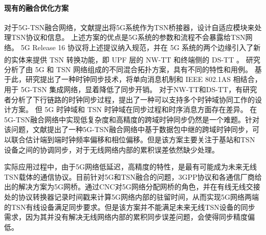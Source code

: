 \documentclass[UTF8,a4paper,12pt]{ctexart}
\numberwithin{equation}{section}
\begin{document}
	\paragraph{现有的融合优化方案}
	对于5G-TSN融合网络，文献\cite{nasrallah2018ultra}提出将5G系统作为TSN桥接器，设计自适应模块来处理TSN协议和信息。 上述方案的优点是5G系统的参数和流程不会暴露给TSN网络。 5G Release 16 协议将上述提议纳入规范，并在 5G 系统的两个边缘引入了新的实体来提供 TSN 转换功能，即 UPF 层的 NW-TT 和终端侧的 DS-TT \textsuperscript{\cite{wang2020leveraging}}。 研究\cite{neumann2018towards}分析了由 5G 和 TSN 网络组成的不同混合拓扑方案，具有不同的特性和用例。 基于此，研究\cite{chai2021cross}提出了一种时钟同步技术，将单向消息机制和 IEEE 802.1AS 相结合，用于 5G-TSN 集成网络，显着降低了同步开销。 对于NW-TT和DS-TT，有研究者\cite{lei20215g}分析了下行链路的时钟同步过程，提出了一种可以支持多个时钟域协同工作的设计方案。 但 5G 时钟域和 TSN 时钟域在同步过程和时序消息方面存在差异。 在5G-TSN融合网络中实现低复杂度和高精度的跨域时钟同步仍然是一个难题。针对该问题，文献\cite{schungel2022time}提出了一种5G-TSN融合网络中基于数据包中继的跨域时钟同步，可以联合估计端到端时钟频率偏移和相位偏移。但是该方案主要关注于基站和TSN设备之间的协调同步，对于无线网络内部的累积误差依然缺少处理。
	
	实际应用过程中，由于5G网络低延迟，高精度的特性，是最有可能成为未来无线TSN载体的通信协议。目前针对5G和TSN融合的问题，3GPP协议和各通信厂商给出的解决方案为5G网桥。通过CNC对5G网络分配网桥的角色，并在有线无线交接处的协议转换器记录时间戳来计算5G网络内部的驻留时间，从而实现5G网络两端的TSN有线设备满足同步要求。但是该方案并不能满足未来无线TSN设备的同步需求，因为其并没有解决无线网络内部的累积同步误差问题，会使得同步精度偏低。
	
\end{document}
